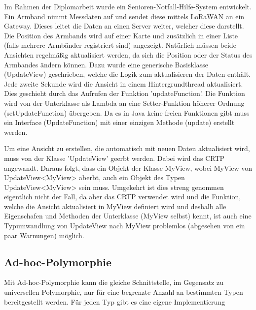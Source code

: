 					Im Rahmen der Diplomarbeit wurde ein Senioren-Notfall-Hilfe-System entwickelt. Ein Armband nimmt Messdaten
					auf und sendet diese mittels LoRaWAN an ein Gateway. Dieses leitet die Daten an einen Server weiter,
					welcher diese darstellt. Die Position des Armbands wird auf einer Karte und zusätzlich in einer Liste
					(falls mehrere Armbänder registriert sind) angezeigt. Natürlich müssen beide Ansichten regelmäßig
					aktualisiert werden, da sich die Position oder der Status des Armbandes ändern können. Dazu wurde eine
					generische Basisklasse (UpdateView) geschrieben, welche die Logik zum aktualisieren der Daten enthält. Jede
					zweite Sekunde wird die Ansicht in einem Hintergrundthread aktualisiert. Dies geschieht durch das Aufrufen
					der Funktion 'updateFunction'. Die Funktion wird von der Unterklasse als Lambda an eine Setter-Funktion
					höherer Ordnung (setUpdateFunction) übergeben. Da es in Java keine freien Funktionen gibt muss ein
					Interface (UpdateFunction) mit einer einzigen Methode (update) erstellt werden.
					
					\UseRawInputEncoding{}
					
					Um eine Ansicht zu erstellen, die automatisch mit neuen Daten aktualisiert wird, muss von der Klasse
					'UpdateView' geerbt werden. Dabei wird das CRTP angewandt. Daraus folgt, dass ein Objekt der Klasse MyView, wobei MyView von UpdateView<MyView> aberbt, auch ein Objekt des Typen UpdateView<MyView> sein muss. Umgekehrt ist dies streng genommen eigentlich nicht der Fall, da aber das CRTP verwendet wird und die Funktion, welche die Ansicht aktualisiert in MyView definiert wird und deshalb alle Eigenschafen und Methoden der Unterklasse (MyView selbst) kennt, ist auch eine Typumwandlung von UpdateView nach MyView problemlos (abgesehen von ein paar Warnungen) möglich.
					
					\UseRawInputEncoding{}
					
					\UseRawInputEncoding{}
					
	\subsection{Ad-hoc-Polymorphie}
		Mit Ad-hoc-Polymorphie kann die gleiche Schnittstelle, im Gegensatz zu universellen Polymorphie, nur für eine
		begrenzte Anzahl an bestimmten Typen bereitgestellt werden. Für jeden Typ gibt es eine eigene Implementierung
	
